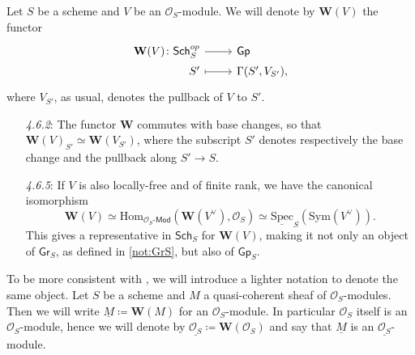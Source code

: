 \begin{defn}\label{defn:fppfSheafAssociatedtoMod}
	Let $S$ be a scheme and $V$ be an $\mathcal{O}_{ S }$-module.
	We will denote by $\mathbf{W}(V)$ the functor
	\begin{equation*}
	\begin{tikzcd}[row sep = 0ex
		,/tikz/column 1/.append style={anchor=base east}
		,/tikz/column 2/.append style={anchor=base west}]
		\mathbf{W}(V)\colon 
		\mathsf{Sch}_{ S }^{op} \arrow[r, "", rightarrow] &
		\mathsf{Gp} \\
		S' \arrow[r, "", mapsto] & 
		\Gamma(S', V_{S'})
	,\end{tikzcd}
	\end{equation*} 
	where $V_{S'}$, as usual, denotes the pullback of
	$V$ to $S'$.
\end{defn}


\begin{rem}\leavevmode\vspace{-1.2\baselineskip}
\begin{enumerate}
\item[{\em 4.6.2}:]
	The functor $\mathbf{W}$ commutes with base changes,
	so that $\mathbf{W}(V)_{S'} \simeq \mathbf{W}(V_{S'})$,
	where the subscript $S'$ denotes respectively the base change 
	and the pullback along $S' \to S$.

\item[{\em 4.6.5}:]
	If $V$ is also  locally-free and of finite rank, we have the canonical isomorphism
	\begin{equation*}
		\mathbf{W}(V) \simeq
		\mathrm{Hom}_{ \mathcal{O}_{ S }\text{-}\mathsf{Mod} }
		\left(\mathbf{W}(V^\vee) , \mathcal{O}_{ S } \right) \simeq
		\underline{\mathrm{Spec}}_S(\mathrm{Sym}(V^\vee))
	.\end{equation*}
	This gives a representative in $\mathsf{Sch}_{ S }$ for 
	$\mathbf{W}(V)$, making it not only an object of $\mathsf{Gr}_S$,
	as defined in \cref{not:GrS}, but also of $\mathsf{Gp}_S$.
\end{enumerate}
\end{rem}


\begin{ntt}\label{not:fppfOsModule}
	To be more consistent with \cite{Messing}, we will introduce a 
	lighter notation to denote the same object.
	Let $S$ be a scheme and $M$ a quasi-coherent sheaf of $\mathcal{O}_{ S }$-modules.
	Then we will write $\underline{M} \coloneqq \mathbf{W}(M)$ for
	an $\mathcal{O}_{ S }$-module.
	In particular $\mathcal{O}_{ S }$ itself is an $\mathcal{O}_{ S }$-module, hence
	we will denote by $\underline{\mathcal{O}_{ S }} \coloneqq \mathbf{W}(\mathcal{O}_{ S })$
	and say that $\underline{M}$ is an $\underline{\mathcal{O}_{ S }}$-module.
\end{ntt}



